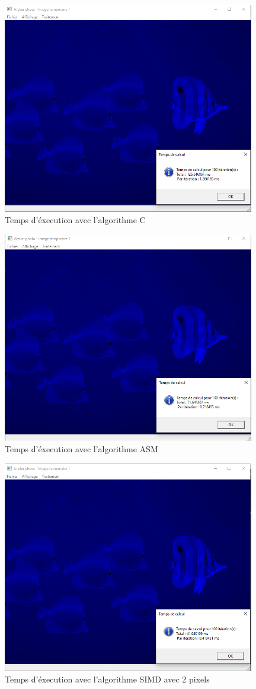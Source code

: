 \documentclass[11pt]{report}
\begin{document}
\begin{figure}[h]
\includegraphics[width=11cm]{CaptureC.PNG}
\caption{Temps d'éxecution avec l'algorithme C}
\end{figure}

\begin{figure}[h]
\includegraphics[width=11cm]{CaptureASM.PNG}
\caption{Temps d'éxecution avec l'algorithme ASM}
\end{figure}

\begin{figure}[h]
\includegraphics[width=11cm]{CaptureSimd2.PNG}
\caption{Temps d'éxecution avec l'algorithme SIMD avec 2 pixels}
\end{figure}
\end{document}
